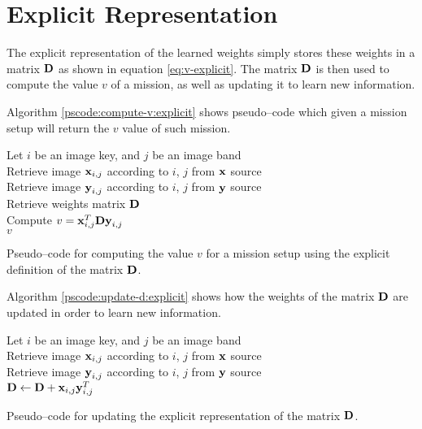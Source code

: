 \section{Explicit Representation} \label{sect:meth:explicit}

The explicit representation of the learned weights simply stores these weights in a matrix $\boldsymbol{\mathbf{D}}$ as shown in equation \ref{eq:v-explicit}. The matrix $\boldsymbol{\mathbf{D}}$ is then used to compute the value $v$ of a mission, as well as updating it to learn new information. \newline

Algorithm \ref{pscode:compute-v:explicit} shows pseudo--code which given a mission setup will return the $v$ value of such mission.

\vspace{0.4cm}
\begin{algorithm}[H]
    \SetAlgoLined
         {
            Let $i$ be an image key, and $j$ be an image band \\
            Retrieve image $\boldsymbol{\mathbf{x}}_{i,j}$ according to $i$, $j$ from $\boldsymbol{\mathbf{x}}$ source \\
            Retrieve image $\boldsymbol{\mathbf{y}}_{i,j}$ according to $i$, $j$ from $\boldsymbol{\mathbf{y}}$ source \\
            Retrieve weights matrix $\boldsymbol{\mathbf{D}}$ \\
            Compute $v = \boldsymbol{\mathbf{x}}_{i,j}^T \boldsymbol{\mathbf{D}} \boldsymbol{\mathbf{y}}_{i,j}$ \\
            \Return $v$
        }
    \caption{Pseudo--code for computing the value $v$ for a mission setup using the explicit definition of the matrix $\boldsymbol{\mathbf{D}}$.}
    \label{pscode:compute-v:explicit}
\end{algorithm}
\vspace{0.4cm}

Algorithm \ref{pscode:update-d:explicit} shows how the weights of the matrix $\boldsymbol{\mathbf{D}}$ are updated in order to learn new information.

\vspace{0.4cm}
\begin{algorithm}[H]
    \SetAlgoLined
         {
            Let $i$ be an image key, and $j$ be an image band \\
            Retrieve image $\boldsymbol{\mathbf{x}}_{i,j}$ according to $i$, $j$ from $\boldsymbol{\mathbf{x}}$ source \\
            Retrieve image $\boldsymbol{\mathbf{y}}_{i,j}$ according to $i$, $j$ from $\boldsymbol{\mathbf{y}}$ source \\
            $\boldsymbol{\mathbf{D}} \gets \boldsymbol{\mathbf{D}} + \boldsymbol{\mathbf{x}}_{i,j}\boldsymbol{\mathbf{y}}_{i,j}^T$ \\
        }
    \caption{Pseudo--code for updating the explicit representation of the matrix $\boldsymbol{\mathbf{D}}$.}
    \label{pscode:update-d:explicit}
\end{algorithm}
\vspace{0.4cm}

